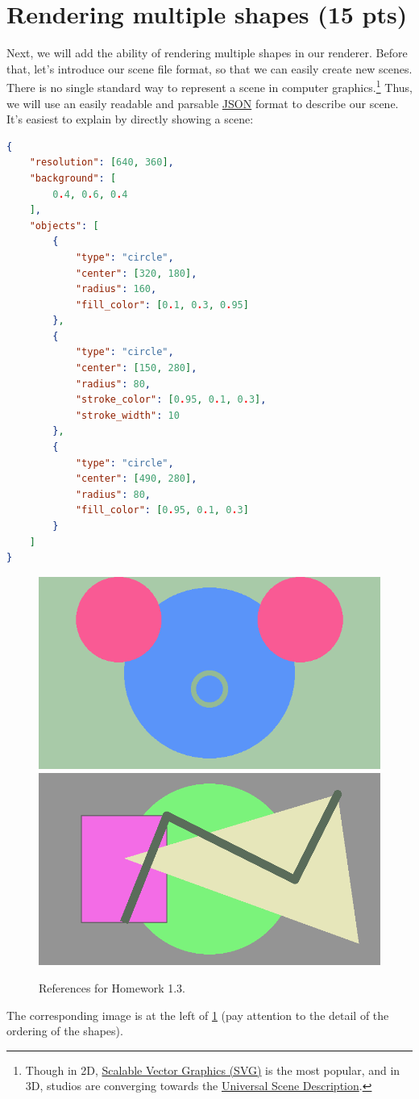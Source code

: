 \section{Rendering multiple shapes (15 pts)}

Next, we will add the ability of rendering multiple shapes in our renderer. Before that, let's introduce our scene file format, so that we can easily create new scenes. There is no single standard way to represent a scene in computer graphics.\footnote{Though in 2D, \href{https://en.wikipedia.org/wiki/SVG}{Scalable Vector Graphics (SVG)} is the most popular, and in 3D, studios are converging towards the \href{https://en.wikipedia.org/wiki/Universal_Scene_Description}{Universal Scene Description}.} Thus, we will use an easily readable and parsable \href{https://en.wikipedia.org/wiki/JSON}{JSON} format to describe our scene. It's easiest to explain by directly showing a scene:
\begin{lstlisting}[language=json]
{
    "resolution": [640, 360],
    "background": [
        0.4, 0.6, 0.4
    ],
    "objects": [
        {
            "type": "circle",
            "center": [320, 180],
            "radius": 160,
            "fill_color": [0.1, 0.3, 0.95]
        },
        {
            "type": "circle",
            "center": [150, 280],
            "radius": 80,
            "stroke_color": [0.95, 0.1, 0.3],
            "stroke_width": 10
        },
        {
            "type": "circle",
            "center": [490, 280],
            "radius": 80,
            "fill_color": [0.95, 0.1, 0.3]
        }
    ]
}
\end{lstlisting}
\begin{figure}[ht]
    \centering
    \includegraphics[width=0.45\linewidth]{imgs/hw_1_3a.png}
    \includegraphics[width=0.45\linewidth]{imgs/hw_1_3b.png}
    \caption{References for Homework 1.3.}
    \label{fig:hw1_3}
\end{figure}
The corresponding image is at the left of \cref{fig:hw1_3} (pay attention to the detail of the ordering of the shapes).

